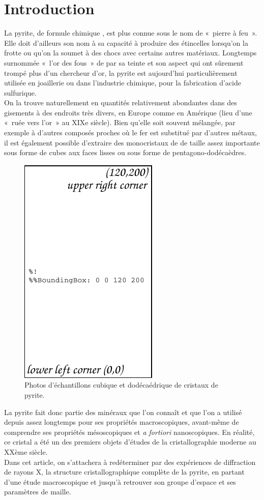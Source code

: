 \section{Introduction}

La pyrite, de formule chimique , est plus connue sous le nom de «~pierre à feu~». Elle doit d'ailleurs son nom à sa capacité à produire des étincelles lorsqu'on la frotte ou qu'on la soumet à des chocs avec certains autres matériaux. Longtemps surnommée «~l'or des fous~» de par sa teinte et son aspect qui ont sûrement trompé plus d'un chercheur d'or, la pyrite est aujourd'hui particulièrement utilisée en joaillerie ou dans l'industrie chimique, pour la fabrication d'acide sulfurique. \\
On la trouve naturellement en quantités relativement abondantes dans des gisements à des endroits très divers, en Europe comme en Amérique (lieu d'une «~ruée vers l'or~» au XIXe siècle). Bien qu'elle soit souvent mélangée, par exemple à d'autres composés proches où le fer est substitué par d'autres métaux, il est également possible d'extraire des monocristaux de  de taille assez importante sous forme de cubes aux faces lisses ou sous forme de pentagono-dodécaèdres.

\begin{figure}
\caption{Photos d'échantillons cubique et dodécaédrique de cristaux de pyrite.}
\includegraphics{figures/fig1}
\end{figure}

La pyrite fait donc partie des minéraux que l'on connaît et que l'on a utilisé depuis assez longtemps pour ses propriétés macroscopiques, avant-même de comprendre ses propriétés mésoscopiques et \textit{a fortiori} nanoscopiques.
En réalité, ce cristal a été un des premiers objets d'études de la cristallographie moderne au XXème siècle.\\
Dans cet article, on s'attachera à redéterminer par des expériences de diffraction de rayons X, la structure cristallographique complète de la pyrite, en partant d'une étude macroscopique et jusqu'à retrouver son groupe d'espace et ses paramètres de maille.


